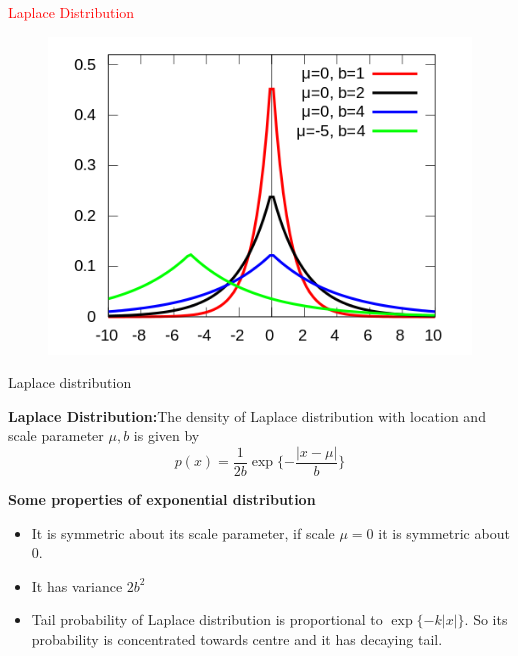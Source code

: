 \documentclass[aspectratio=169]{beamer}
\newcommand{\tcr}{\textcolor{red}}
\begin{document}
\begin{frame}
\begin{center}
\Huge \tcr{Laplace Distribution}
\end{center}
\begin{figure}[!ht]
        \centering
        \includegraphics[scale=0.5]{Laplace.png}
        \label{fig:lap}
\end{figure}
\end{frame}


\begin{frame}{Laplace distribution}
\begin{definition}
\textbf{Laplace Distribution:}The density of Laplace distribution with location and scale parameter $\mu, b$ is given by
$$p(x)=\frac{1}{2b}\exp{\{-\frac{|x-\mu|}{b}\}}$$
\end{definition}

\textbf{Some properties of exponential distribution}
\begin{itemize}
\item
It is symmetric about its scale parameter, if scale $\mu=0$ it is symmetric about 0.
\item
It has variance $2b^2$
\item
Tail probability of Laplace distribution is proportional to $\exp{\{-k|x|\}}$. So its probability is concentrated towards centre and it has decaying tail.
\end{itemize}
\end{frame}
\end{document}
